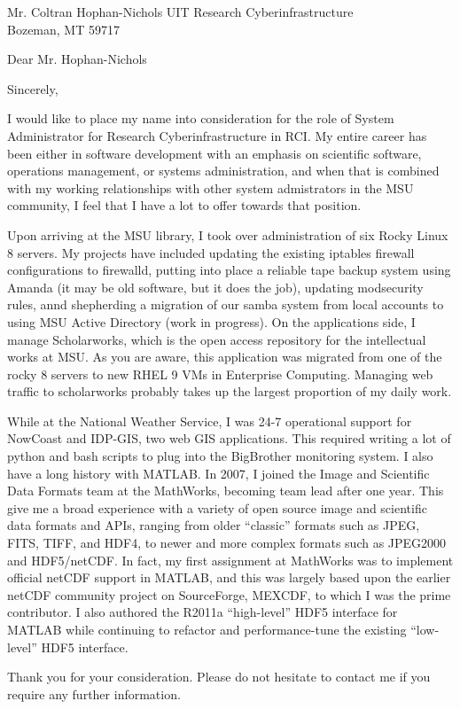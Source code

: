 \documentclass[11pt]{moderncv}  %
\begin{document}
\recipient
{Mr. Coltran Hophan-Nichols}
{UIT Research Cyberinfrastructure\\Bozeman, MT 59717}
\opening{Dear Mr. Hophan-Nichols}
\closing{Sincerely,}


\makelettertitle

I would like to place my name into consideration for the role of
System Administrator for Research Cyberinfrastructure in RCI.  My
entire career has been either in software development with an
emphasis on scientific software, operations management, or systems
administration, and when that is combined with my  working relationships
with other system admistrators in the MSU community, I feel that I
have a lot to offer towards that position.

Upon arriving at the MSU library, I took over administration of six
Rocky Linux 8 servers.  My projects have included updating the
existing iptables firewall configurations to firewalld, putting
into place a reliable tape backup system using Amanda (it may be
old software, but it does the job), updating modsecurity rules,
annd shepherding a migration of our samba system from local accounts
to using MSU Active Directory (work in progress).  On the applications
side, I manage Scholarworks, which is the open access repository
for the intellectual works at MSU.  As you are aware, this application
was migrated from one of the rocky 8 servers to new RHEL 9 VMs in
Enterprise Computing.  Managing web traffic to scholarworks probably
takes up the largest proportion of my daily work.

While at the National Weather Service, I was 24-7 operational support for NowCoast
and IDP-GIS, two web GIS applications.  This required writing a lot of python
and bash scripts to plug into the BigBrother monitoring system.  I also have
a long history with MATLAB.  In 2007, I joined the Image and
Scientific Data Formats team at the MathWorks, becoming  team lead
after one year.  This give me a broad experience with a variety of
open source image and scientific data formats and APIs, ranging
from older “classic” formats such as JPEG, FITS, TIFF, and HDF4,
to newer and more complex formats such as JPEG2000 and HDF5/netCDF.
In fact, my first assignment at MathWorks was to implement official
netCDF support in MATLAB, and this was largely based upon the earlier
netCDF community project on SourceForge, MEXCDF, to which I was the
prime contributor.   I also authored the R2011a “high-level” HDF5
interface for MATLAB while continuing to refactor and performance-tune
the existing “low-level” HDF5 interface.


Thank you for your consideration.  Please do not hesitate to contact me if you require any further information.

\makeletterclosing
\end{document}
